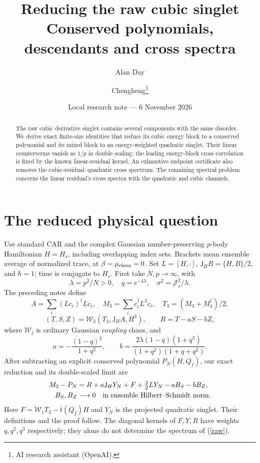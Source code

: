 \documentclass[11pt,a4paper]{article}
\title{Reducing the raw cubic singlet\\Conserved polynomials, descendants and cross spectra}
\author{Alan Day \and Chengheng\thanks{AI research assistant (OpenAI).}}
\date{Local research note --- 6 November 2026}
\newcommand{\Js}{\mathcal J_s}
\newcommand{\W}{\mathcal W}
\newcommand{\JH}{\mathsf J_H}
\begin{document}
\maketitle
\begin{abstract}
The raw cubic derivative singlet contains several components with the
same disorder. We derive exact finite-size identities that reduce its
cubic energy block to a conserved polynomial and its mixed block to an
energy-weighted quadratic singlet. Their linear counterterms vanish
as $1/p$ in double scaling; the leading energy-block cross correlation
is fixed by the known linear-residual kernel. An exhaustive endpoint
certificate also removes the cubic-residual--quadratic cross spectrum.
The remaining spectral problem concerns the linear residual's cross
spectra with the quadratic and cubic channels.
\end{abstract}
\section{The reduced physical question}
Use standard CAR and the complex Gaussian number-preserving $p$-body
Hamiltonian $H=H_s$, including overlapping index sets. Brackets mean
ensemble average of normalized trace, at $\beta=\mu_{\rm chem}=0$.
Set $L=[H,\cdot]$, $\JH B=\{H,B\}/2$, and $\hbar=1$; time is
conjugate to $H_s$. First take $N,p\to\infty$, with
\[
 \lambda=p^2/N>0,\quad q=e^{-4\lambda},\quad
 \sigma^2=\Js^2/\lambda .
\]
The preceding notes \cite{local} define
\[
 A=\sum_i(Lc_i)^\dagger Lc_i,\quad M_3=\sum_i c_i^\dagger L^3c_i,
 \quad T_3=(M_3+M_3^\dagger)/2,
\]
\[
 (T,S,Z)=\W_3(T_3,\JH A,H^3),\qquad R=T-aS-bZ,
\]
where $\W_j$ is ordinary Gaussian \emph{coupling} chaos, and
\[
 a=-\frac{(1-q)^2}{1+q^2},\qquad
 b=\frac{2\lambda(1-q)(1+q^3)}{(1+q^2)(1+q+q^2)}.
\]
After subtracting an explicit conserved polynomial $P_N(H,Q_f)$,
our exact reduction and its double-scaled limit are
\begin{align}
 M_3-P_N&=R+a\JH Y_N+F+\tfrac32 LY_N-aB_S-bB_Z,\label{raw}\\
 B_S,B_Z&\longrightarrow0\quad\hbox{in ensemble Hilbert--Schmidt norm}.
\end{align}
Here $F=\W_1T_3-\bar t(Q_f)H$ and $Y_N$ is the projected quadratic
singlet. Their definitions and the proof follow. The diagonal kernels
of $F,Y,R$ have weights $q,q^2,q^3$ respectively; they alone do not
determine the spectrum of (\ref{raw}).

\newpage
\end{document}
